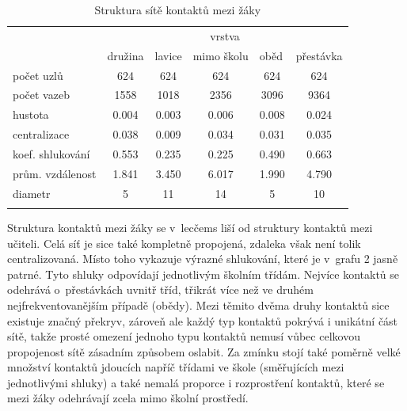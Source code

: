 \begin{table}
    \centering
    \caption{Struktura sítě kontaktů mezi žáky}
\begin{tabular}{lccccc}
\hline
                 & \multicolumn{5}{c}{vrstva}                                                                                                                           \\ 
                 & \multicolumn{1}{l}{družina} & \multicolumn{1}{l}{lavice} & \multicolumn{1}{l}{mimo školu} & \multicolumn{1}{l}{oběd} & \multicolumn{1}{l}{přestávka} \\ \hline
počet uzlů       & 624                         & 624                        & 624                            & 624                      & 624                           \\
počet vazeb      & 1558                        & 1018                       & 2356                           & 3096                     & 9364                          \\
hustota          & 0.004                       & 0.003                      & 0.006                          & 0.008                    & 0.024                         \\
centralizace     & 0.038                       & 0.009                      & 0.034                          & 0.031                    & 0.035                         \\
koef. shlukování & 0.553                       & 0.235                      & 0.225                          & 0.490                    & 0.663                         \\
prům. vzdálenost & 1.841                       & 3.450                      & 6.017                          & 1.990                    & 4.790                         \\
diametr          & 5                           & 11                         & 14                             & 5                        & 10                            \\ \hline
\label{tab:100-students}
\end{tabular}
\end{table}

Struktura kontaktů mezi žáky se v~lecčems liší od struktury kontaktů mezi učiteli. Celá síť je sice také kompletně propojená, zdaleka však není tolik centralizovaná. Místo toho vykazuje výrazné shlukování, které je v~grafu 2 jasně patrné. Tyto shluky odpovídají jednotlivým školním třídám. Nejvíce kontaktů se odehrává o~přestávkách uvnitř tříd, třikrát více než ve druhém nejfrekventovanějším případě (obědy). Mezi těmito dvěma druhy kontaktů sice existuje značný překryv, zároveň ale každý typ kontaktů pokrývá i unikátní část sítě, takže prosté omezení jednoho typu kontaktů nemusí vůbec celkovou propojenost sítě zásadním způsobem oslabit. Za zmínku stojí také poměrně velké množství kontaktů jdoucích napříč třídami ve škole (směřujících mezi jednotlivými shluky) a také nemalá proporce i rozprostření kontaktů, které se mezi žáky odehrávají zcela mimo školní prostředí. 


